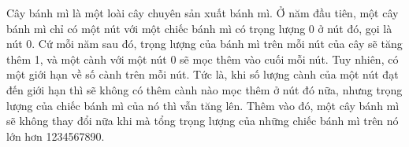 Cây bánh mì là một loài cây chuyên sản xuất bánh mì. Ở năm đầu tiên, một cây bánh mì chỉ có một nút với một chiếc bánh mì có trọng lượng 0 ở nút đó, gọi là nút 0. Cứ mỗi năm sau đó, trọng lượng của bánh mì trên mỗi nút của cây sẽ tăng thêm 1, và một cành với một nút 0 sẽ mọc thêm vào cuối mỗi nút. Tuy nhiên, có một giới hạn về số cành trên mỗi nút. Tức là, khi số lượng cành của một nút đạt đến giới hạn thì sẽ không có thêm cành nào mọc thêm ở nút đó nữa, nhưng trọng lượng của chiếc bánh mì của nó thì vẫn tăng lên. Thêm vào đó, một cây bánh mì sẽ không thay đổi nữa khi mà tổng trọng lượng của những chiếc bánh mì trên nó lớn hơn 1234567890.  

\